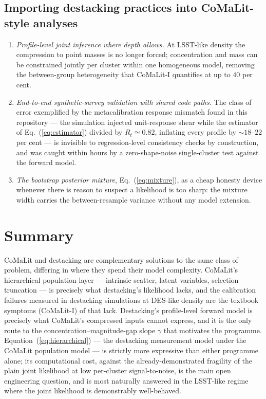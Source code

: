 \documentclass[11pt,a4paper]{article}
\begin{document}
\subsection{Importing destacking practices into CoMaLit-style analyses}

\begin{enumerate}
\item \emph{Profile-level joint inference where depth allows.} At
LSST-like density the compression to point masses is no longer forced;
concentration and mass can be constrained jointly per cluster within one
homogeneous model, removing the between-group heterogeneity that
CoMaLit-I quantifies at up to $40$ per cent.
\item \emph{End-to-end synthetic-survey validation with shared code
paths.} The class of error exemplified by the metacalibration response
mismatch found in this repository --- the simulation injected unit-response
shear while the estimator of Eq.~(\ref{eq:estimator}) divided by
$R_t \simeq 0.82$, inflating every profile by ${\sim}18$--$22$ per cent ---
is invisible to regression-level consistency checks by construction, and
was caught within hours by a zero-shape-noise single-cluster test against
the forward model.
\item \emph{The bootstrap posterior mixture}, Eq.~(\ref{eq:mixture}), as a
cheap honesty device whenever there is reason to suspect a likelihood is
too sharp: the mixture width carries the between-resample variance without
any model extension.
\end{enumerate}

\section{Summary}

CoMaLit and destacking are complementary solutions to the same class of
problem, differing in where they spend their model complexity. CoMaLit's
hierarchical population layer --- intrinsic scatter, latent variables,
selection truncation --- is precisely what destacking's likelihood lacks,
and the calibration failures measured in destacking simulations at
DES-like density are the textbook symptoms (CoMaLit-I) of that lack.
Destacking's profile-level forward model is precisely what CoMaLit's
compressed inputs cannot express, and it is the only route to the
concentration--magnitude-gap slope $\gamma$ that motivates the programme.
Equation~(\ref{eq:hierarchical}) --- the destacking measurement model under
the CoMaLit population model --- is strictly more expressive than either
programme alone; its computational cost, against the already-demonstrated
fragility of the plain joint likelihood at low per-cluster signal-to-noise,
is the main open engineering question, and is most naturally answered in
the LSST-like regime where the joint likelihood is demonstrably
well-behaved.
\end{document}
